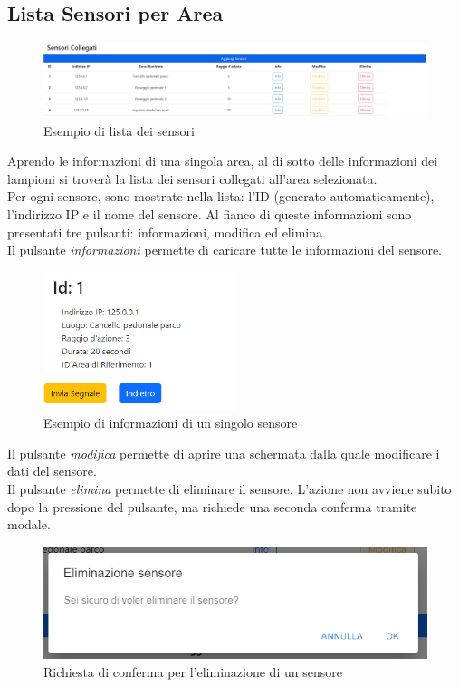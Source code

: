 \documentclass[a4paper, 12pt]{article}
\begin{document}
\subsection{Lista Sensori per Area}
\begin{figure}[H]
\centering
\includegraphics[width=\textwidth]{ListaSensori}
\caption{Esempio di lista dei sensori}
\end{figure}
Aprendo le informazioni di una singola area, al di sotto delle informazioni dei lampioni si troverà la lista dei sensori collegati all'area selezionata.\\
Per ogni sensore, sono mostrate nella lista: l'ID (generato automaticamente), l'indirizzo IP e il nome del sensore. Al fianco di queste informazioni sono presentati tre pulsanti: informazioni, modifica ed elimina. \\
Il pulsante \textit{informazioni} permette di caricare tutte le informazioni del sensore.\\
\begin{figure}[H]
\centering
\includegraphics[width=0.5\textwidth]{InfoSensore}
\caption{Esempio di informazioni di un singolo sensore}
\end{figure}
Il pulsante \textit{modifica} permette di aprire una schermata dalla quale modificare i dati del sensore.\\
Il pulsante \textit{elimina} permette di eliminare il sensore. L'azione non avviene subito dopo la pressione del pulsante, ma richiede una seconda conferma tramite modale. \\
\begin{figure}[H]
\centering
\includegraphics[width=\textwidth]{ModaleEliminazioneSensore}
\caption{Richiesta di conferma per l'eliminazione di un sensore }
\end{figure}
\end{document}
